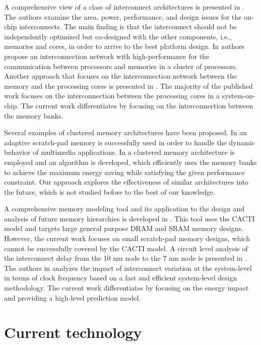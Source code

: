 A comprehensive view of a class of interconnect architectures is presented in \cite{kumar2005interconnections}. 
The authors examine the area, power, performance, and design issues for the on-chip interconnects.
The main finding is that the interconnect should not be independently optimized but co-designed with the other components, i.e., memories and cores, in order to arrive to the best platform design.
In \cite{rahimi2011fully} authors propose an interconnection network with high-performance for the communication between processors and memories in a cluster of processors.
Another approach that focuses on the interconnection network between the memory and the processing cores is presented in \cite{kang2012high}. 
The majority of the published work focuses on the interconnection between the processing cores in a system-on-chip.
The current work differentiates by focusing on the interconnection between the memory banks.

Several examples of clustered memory architectures have been proposed.
In \cite{cho2009adaptive} an adaptive scratch-pad memory is successfully used in order to handle the dynamic behavior of multimedia applications.
In \cite{wang2005energy} a clustered memory architecture is employed and an algorithm is developed, which efficiently uses the memory banks to achieve the maximum energy saving while satisfying the given performance constraint.
Our approach explores the effectiveness of similar architectures into the future, which is not studied before to the best of our knowledge.

A comprehensive memory modeling tool and its application to the design and analysis of future memory hierarchies is developed in \cite{thoziyoor2008comprehensive}. 
This tool uses the CACTI model and targets large general purpose DRAM and SRAM memory designs.
However, the current work focuses on small scratch-pad memory designs, which cannot be successfully covered by the CACTI model.
A circuit level analysis of the interconnect delay from the 10 nm node to the 7 nm node is presented in \cite{pan2014system}.
The authors in \cite{chen2014interconnect} analyzes the impact of interconnect variation at the system-level in terms of clock frequency based on a fast and efficient system-level design methodology. 
The current work differentiates by focusing on the energy impact and providing a high-level prediction model.

\section{Current technology}
\label{Current}

